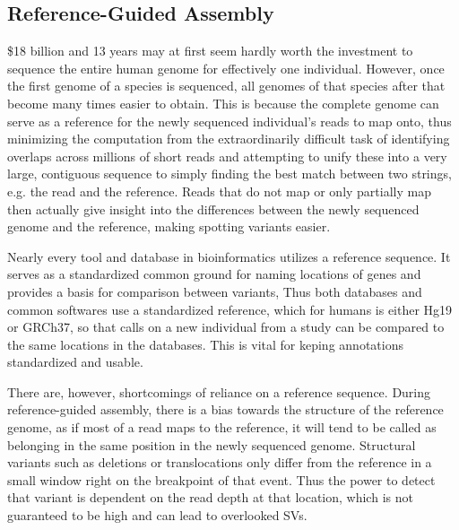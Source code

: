 \documentclass{easychithesis}
\begin{document}
\subsection{Reference-Guided Assembly}
\$18 billion and 13 years may at first seem hardly worth the investment to sequence the entire human genome for effectively one individual. However, once the first genome of a species is sequenced, all genomes of that species after that become many times easier to obtain. This is because the complete genome can serve as a reference for the newly sequenced individual's reads to map onto, thus minimizing the computation from the extraordinarily difficult task of identifying overlaps across millions of short reads and attempting to unify these into a very large, contiguous sequence to simply finding the best match between two strings, e.g. the read and the reference. Reads that do not map or only partially map then actually give insight into the differences between the newly sequenced genome and the reference, making spotting variants easier.

Nearly every tool and database in bioinformatics utilizes a reference sequence. It serves as a standardized common ground for naming locations of genes and provides a basis for comparison between variants, Thus both databases and common softwares use a standardized reference, which for humans is either Hg19 or GRCh37, so that calls on a new individual from a study can be compared to the same locations in the databases. This is vital for keping annotations standardized and usable.

There are, however, shortcomings of reliance on a reference sequence. During reference-guided assembly, there is a bias towards the structure of the reference genome, as if most of a read maps to the reference, it will tend to be called as belonging in the same position in the newly sequenced genome.  Structural variants such as deletions or translocations only differ from the reference in a small window right on the breakpoint of that event. Thus the power to detect that variant is dependent on the read depth at that location, which is not guaranteed to be high and can lead to overlooked SVs.
\end{document}
